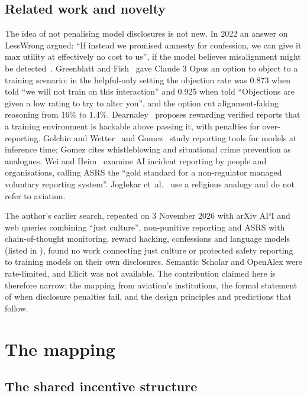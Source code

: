 \documentclass[11pt]{article}
\begin{document}
\subsection{Related work and novelty}\label{sec:related}

The idea of not penalising model disclosures is not new. In 2022 an answer on LessWrong argued: ``If instead we promised amnesty for confession, we can give it max utility at effectively no cost to us'', if the model believes misalignment might be detected~\cite{makoyass2022}. Greenblatt and Fish~\cite{greenblatt2025} gave Claude 3 Opus an option to object to a training scenario: in the helpful-only setting the objection rate was 0.873 when told ``we will not train on this interaction'' and 0.925 when told ``Objections are given a low rating to try to alter you'', and the option cut alignment-faking reasoning from 16\% to 1.4\%. Dearnaley~\cite{dearnaley2026} proposes rewarding verified reports that a training environment is hackable above passing it, with penalties for over-reporting. Golchin and Wetter~\cite{golchin2026} and Gomez~\cite{gomez2026} study reporting tools for models at inference time; Gomez cites whistleblowing and situational crime prevention as analogues. Wei and Heim~\cite{weiheim2026} examine AI incident reporting by people and organisations, calling ASRS the ``gold standard for a non-regulator managed voluntary reporting system''. Joglekar et~al.~\cite{joglekar2025} use a religious analogy and do not refer to aviation.

The author's earlier search, repeated on 3 November 2026 with arXiv API and web queries combining ``just culture'', non-punitive reporting and ASRS with chain-of-thought monitoring, reward hacking, confessions and language models (listed in ), found no work connecting just culture or protected safety reporting to training models on their own disclosures. Semantic Scholar and OpenAlex were rate-limited, and Elicit was not available. The contribution claimed here is therefore narrow: the mapping from aviation's institutions, the formal statement of when disclosure penalties fail, and the design principles and predictions that follow.

\section{The mapping}\label{sec:mapping}

\subsection{The shared incentive structure}\label{sec:incentive}
\end{document}

